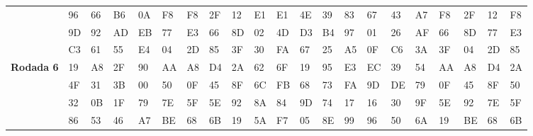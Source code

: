 \documentclass[
    article,            %
    11pt,               %
    oneside,            %
    a4paper,            %
    english,            %
    brazil,             %
    sumario=tradicional,
    ]{abntex2}
\begin{document}
\begin{table}[H]
{\begin{tabular}{|
>{\columncolor[HTML]{C0C0C0}}l |llll|llll|llll|llll|llll|}
\textbf{}          & 96              & 66              & B6              & 0A              & F8             & F8             & 2F            & 12            & E1             & E1            & 4E            & 39            & 83              & 67             & 43             & A7             & F8             & 2F             & 12             & F8            \\
\textbf{}          & 9D              & 92              & AD              & EB              & 77             & E3             & 66            & 8D            & 02             & 4D            & D3            & B4            & 97              & 01             & 26             & AF             & 66             & 8D             & 77             & E3            \\
\textbf{}          & C3              & 61              & 55              & E4              & 04             & 2D             & 85            & 3F            & 30             & FA            & 67            & 25            & A5              & 0F             & C6             & 3A             & 3F             & 04             & 2D             & 85            \\ \hline
\textbf{Rodada 6}  & 19              & A8              & 2F              & 90              & AA             & A8             & D4            & 2A            & 62             & 6F            & 19            & 95            & E3              & EC             & 39             & 54             & AA             & A8             & D4             & 2A            \\
\textbf{}          & 4F              & 31              & 3B              & 00              & 50             & 0F             & 45            & 8F            & 6C             & FB            & 68            & 73            & FA              & 9D             & DE             & 79             & 0F             & 45             & 8F             & 50            \\
\textbf{}          & 32              & 0B              & 1F              & 79              & 7E             & 5F             & 5E            & 92            & 8A             & 84            & 9D            & 74            & 17              & 16             & 30             & 9F             & 5E             & 92             & 7E             & 5F            \\
\textbf{}          & 86              & 53              & 46              & A7              & BE             & 68             & 6B            & 19            & 5A             & F7            & 05            & 8E            & 99              & 96             & 50             & 6A             & 19             & BE             & 68             & 6B            \\ \hline

\end{tabular}}
\end{table}
\end{document}
